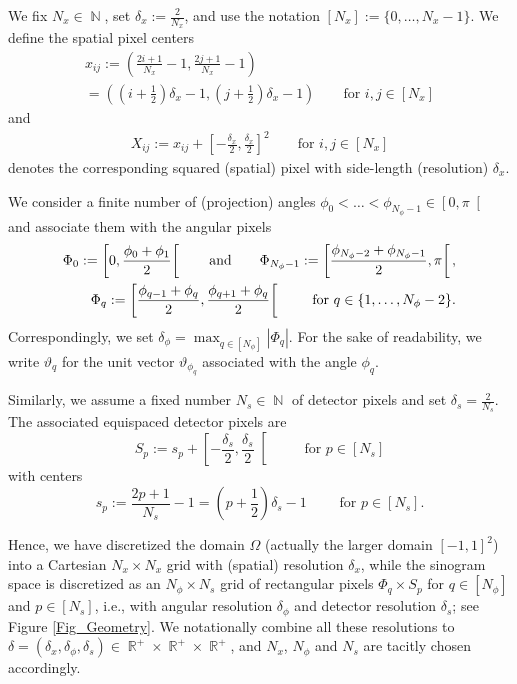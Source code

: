 \documentclass[11pt,reqno]{amsart}
\DeclareMathOperator{\RR}{\mathbb{R}}
\DeclareMathOperator{\NN}{\mathbb{N}}
\numberwithin{theorem}{section}
\theoremstyle{remark}
\begin{document}
We fix $N_x\in \NN$, set $\delta_x:=\frac{2}{N_x}$, and use the notation $[N_x]:=\{0,\dots,N_x-1\}$. We define the spatial pixel centers 
\begin{multline}
x_{ij}:= \left ( \frac{2i+1}{N_x}-1,\frac{2j+1}{N_x}-1 \right)
\\
=\left(\left(i+\frac{1}{2}\right)\delta_x-1,\left (j+\frac{1}{2}\right)\delta_x-1\right) \qquad \text{for }i,j\in [N_x] 
\end{multline}
 and 
\begin{align}
 X_{ij}:=x_{ij}+\left[-\frac {\delta_x}{2},\frac{\delta_x}{2}\right]^2   \qquad { \text{for }i,j\in [N_x] }
\end{align} 
denotes the corresponding squared (spatial) pixel with side-length (resolution) $\delta_x$.

We consider a finite number of (projection) angles $\phi_0< \dots <\phi_{N_\phi-1} \in \left[0,\pi\right[$ and associate them with the angular pixels 
\begin{align}
\Phi_0 :=\left[0,\frac{\phi_{0}+\phi_1}{2}\right[ \qquad \text{and} \qquad \Phi_{N_\phi-1}:= \left[\frac{\phi_{N_\phi-2}+\phi_{N_\phi-1}}{2},\pi\right[, \notag
\\
\Phi_q := \left[\frac{\phi_{q-1}+\phi_q}{2},\frac{\phi_{q+1}+\phi_q}{2}\right[ \qquad \text{ for }q\in \{1,\dots,N_\phi-2\}.
\end{align}
Correspondingly, we set $\delta_\phi=\max_{q\in [N_\phi]} |\Phi_q|$. 
For the sake of readability, we write $\vartheta_q$ for the unit vector $\vartheta_{\phi_q}$ associated with the angle $\phi_q$.

Similarly, we assume a fixed number $N_s\in \NN$ of detector pixels and set $\delta_s=\frac{2}{N_s}$. 
The associated equispaced detector pixels are 
\begin{equation}
S_p:= s_p+\left[-\frac{\delta_s}{2},\frac{\delta_s}{2}\right[ \qquad \text{ for }p\in [N_s] 
\end{equation}
with centers 
\begin{equation}
s_p := \frac{2p+1}{N_s}-1 = \left(p+\frac{1}{2}\right) \delta_s-1 \qquad \text{ for }p\in [N_s] . 
\end{equation}

Hence, we have discretized the domain $\Omega$ (actually the larger domain $[-1,1]^2$) into a Cartesian $N_x\times N_x$ grid with (spatial) resolution $\delta_x$, while the sinogram space is discretized as an $N_\phi\times N_s$ grid of rectangular pixels $\Phi_q\times S_p$ for $q\in [N_\phi]$ and $p\in [N_s]$, i.e., with angular resolution $\delta_\phi$ and detector resolution $\delta_s$; see Figure \ref{Fig_Geometry}. We notationally combine all these resolutions to $\delta=(\delta_x,\delta_\phi,\delta_s)\in \RR^+\times\RR^+\times\RR^+$, and $N_x$, $N_\phi$ and $N_s$ are tacitly chosen accordingly.
\end{document}
